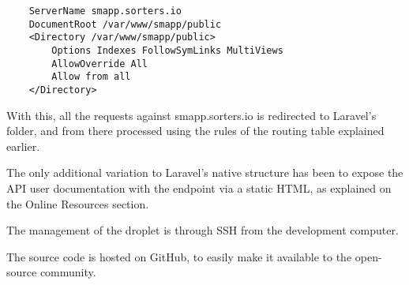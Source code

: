 \begin{verbatim}
	ServerName smapp.sorters.io
	DocumentRoot /var/www/smapp/public
	<Directory /var/www/smapp/public>
		Options Indexes FollowSymLinks MultiViews
		AllowOverride All
		Allow from all
	</Directory>
\end{verbatim}

With this, all the requests against smapp.sorters.io is redirected to Laravel’s  folder, and from there processed using the rules of the routing table explained earlier.

The only additional variation to Laravel’s native structure has been to expose the API user documentation with the  endpoint via a static HTML, as explained on the Online Resources section.

The management of the droplet is through SSH from the development computer.

The source code is hosted on GitHub, to easily make it available to the open-source community.
